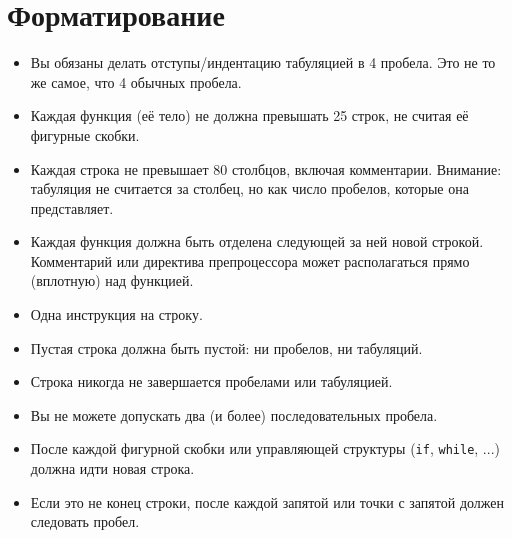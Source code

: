 \documentclass{42-ru}
\begin{document}
    \newpage


    \section{Форматирование}

            \begin{itemize}

                \item Вы обязаны делать отступы/индентацию табуляцией в 4 пробела. Это не то же самое, что 4 обычных пробела.

                \item Каждая функция (её тело) не должна превышать 25 строк, не считая её фигурные скобки.

                \item Каждая строка не превышает 80 столбцов, включая комментарии. Внимание: табуляция не считается за столбец, но как число пробелов, которые она представляет.

                \item Каждая функция должна быть отделена следующей за ней новой строкой. Комментарий или директива препроцессора может располагаться прямо (вплотную) над функцией.

                \item Одна инструкция на строку.

                \item Пустая строка должна быть пустой: ни пробелов, ни табуляций.

                \item Строка никогда не завершается пробелами или табуляцией.

                \item Вы не можете допускать два (и более) последовательных пробела.

                \item После каждой фигурной скобки или управляющей структуры (\texttt{if}, \texttt{while}, ...) должна идти новая строка.

                \item Если это не конец строки, после каждой запятой или точки с запятой должен следовать пробел.


\end{itemize}
\end{document}
